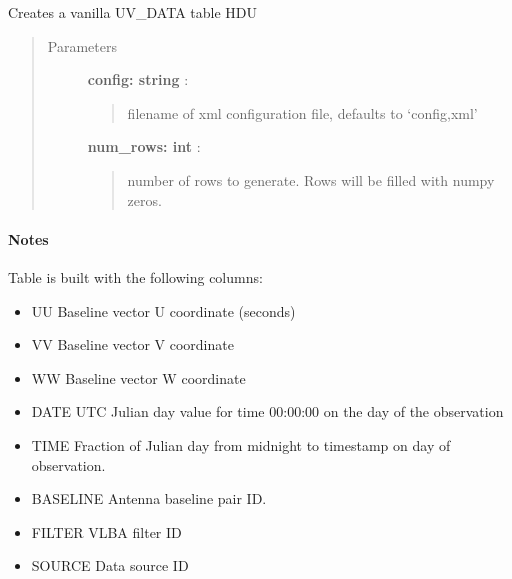 \documentclass[letterpaper,10pt,english]{sphinxmanual}
\begin{document}

\begin{fulllineitems}
\label{index:pyFitsidi.make_uv_data}
Creates a vanilla UV\_DATA table HDU
\begin{quote}\begin{description}
\item[{Parameters }] \leavevmode
\textbf{config: string} :
\begin{quote}

filename of xml configuration file, defaults to `config,xml'
\end{quote}

\textbf{num\_rows: int} :
\begin{quote}

number of rows to generate. Rows will be filled with numpy zeros.
\end{quote}

\end{description}\end{quote}
\paragraph{Notes}

Table is built with the following columns:
\begin{itemize}
\item {} 
UU           Baseline vector U coordinate (seconds)

\item {} 
VV           Baseline vector V coordinate

\item {} 
WW           Baseline vector W coordinate

\item {} 
DATE         UTC Julian day value for time 00:00:00  on the day of the observation

\item {} 
TIME         Fraction of Julian day from midnight to timestamp on day of observation.

\item {} 
BASELINE     Antenna baseline pair ID.

\item {} 
FILTER       VLBA filter ID

\item {} 
SOURCE       Data source ID


\end{itemize}
\end{fulllineitems}
\end{document}
